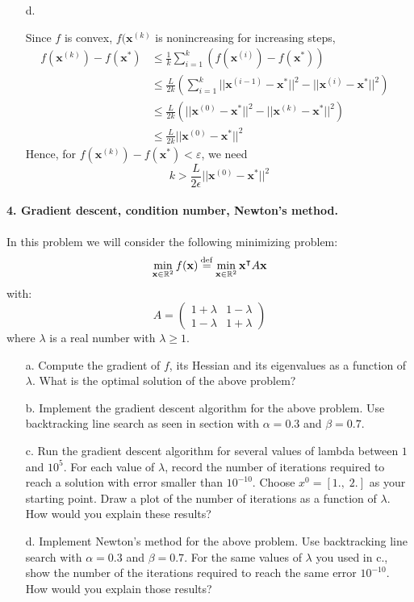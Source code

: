 \documentclass[11pt]{article}
\newcommand{\eps}{\varepsilon}
\theoremstyle{remark}
\newcommand{\R}{\mathbb{R}}                     %
\newcommand{\eqdef}{\mathbin{\stackrel{\rm def}{=}}}
\newcommand{\bx}{\mathbf{x}}
\begin{document}
\begin{itemize}
\item[d.]

Since $f$ is convex, $f(\bx^{(k)}$ is nonincreasing for increasing steps,
\begin{align*}
f(\bx^{(k)})-f(\bx^*) &\leq \frac{1}{k} \sum_{i=1}^{k} (f(\bx^{(i)})-f(\bx^*)) &\\
&\leq \frac{L}{2k} (\sum_{i=1}^{k} ||\bx^{(i-1)}-\bx^*||^2 - ||\bx^{(i)}-\bx^*||^2) &\\
&\leq \frac{L}{2k} (||\bx^{(0)}-\bx^*||^2 - ||\bx^{(k)}-\bx^*||^2) &\\
&\leq \frac{L}{2k} ||\bx^{(0)}-\bx^*||^2
\end{align*}
Hence, for $f(\bx^{(k)}) - f(\bx^*)<\eps$, we need
$$k > \frac{L}{2\epsilon}||\bx^{(0)}-\bx^*||^2$$

\end{itemize}
\color{black}


\paragraph{4. Gradient descent, condition number, Newton's method.}

In this problem we will consider the following minimizing problem:
\begin{displaymath}
    \min_{\bx\in\R^2} f(\bx) \eqdef \min_{\bx\in\R^2}\bx^\intercal A\bx
\end{displaymath}
with:
\begin{displaymath}
    A = \begin{pmatrix}
        1+\lambda & 1-\lambda \\
        1-\lambda & 1+\lambda
    \end{pmatrix}
\end{displaymath}
where $\lambda$ is a real number with $\lambda \geq 1$.
\begin{itemize}
    \item[a.] Compute the gradient of $f$, its Hessian and its eigenvalues as
        a function of $\lambda$. What is the optimal solution of the above
        problem?
    \item[b.] Implement the gradient descent algorithm for the above problem.
        Use backtracking line search as seen in section with $\alpha = 0.3$ and
        $\beta = 0.7$.
    \item[c.] Run the gradient descent algorithm for several values of lambda
        between $1$ and $10^5$. For each value of $\lambda$, record the number
        of iterations required to reach a solution with error smaller than
        $10^{-10}$. Choose $x^0 = [1., \; 2.]$ as your starting point. Draw
        a plot of the number of iterations as a function of $\lambda$. How
        would you explain these results?
    \item[d.] Implement Newton's method for the above problem. Use backtracking
        line search with $\alpha = 0.3$ and $\beta = 0.7$. For the same values of
        $\lambda$ you used in c., show the number of the iterations required to
        reach the same error $10^{-10}$. How would you explain those results?
\end{itemize}
\end{document}
